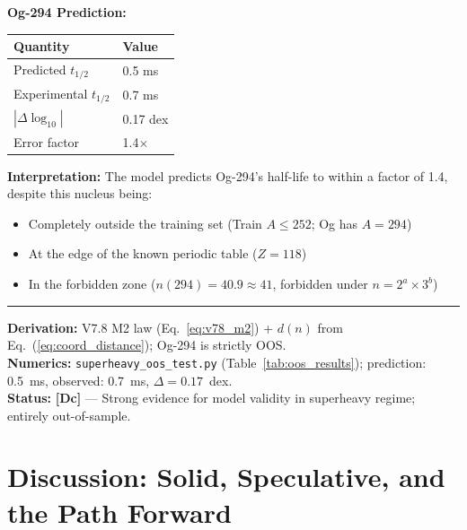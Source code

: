 \documentclass[11pt,a4paper]{article}
\newcommand{\tagDc}{\textcolor{blue!70!black}{\textbf{[Dc]}}}
\begin{document}
\begin{resultbox}
\textbf{Og-294 Prediction:}

\begin{center}
\begin{tabular}{ll}
\toprule
\textbf{Quantity} & \textbf{Value} \\
\midrule
Predicted $t_{1/2}$ & 0.5 ms \\
Experimental $t_{1/2}$ & 0.7 ms \\
$|\Delta \log_{10}|$ & 0.17 dex \\
Error factor & 1.4$\times$ \\
\bottomrule
\end{tabular}
\end{center}

\textbf{Interpretation:} The model predicts Og-294's half-life to within a factor of 1.4, despite this nucleus being:
\begin{itemize}[nosep]
    \item Completely outside the training set (Train $A \leq 252$; Og has $A = 294$)
    \item At the edge of the known periodic table ($Z = 118$)
    \item In the forbidden zone ($n(294) = 40.9 \approx 41$, forbidden under $n = 2^a \times 3^b$)
\end{itemize}

\vspace{0.3em}\hrule\vspace{0.3em}
\textbf{Derivation:} V7.8 M2 law (Eq.~\ref{eq:v78_m2}) + $d(n)$ from Eq.~(\ref{eq:coord_distance}); Og-294 is strictly OOS.\\
\textbf{Numerics:} \texttt{superheavy\_oos\_test.py} (Table~\ref{tab:oos_results}); prediction: 0.5~ms, observed: 0.7~ms, $\Delta = 0.17$~dex.\\
\textbf{Status:} \tagDc{} --- Strong evidence for model validity in superheavy regime; entirely out-of-sample.
\end{resultbox}

\newpage


\part{Discussion: Solid, Speculative, and the Path Forward}
\end{document}
